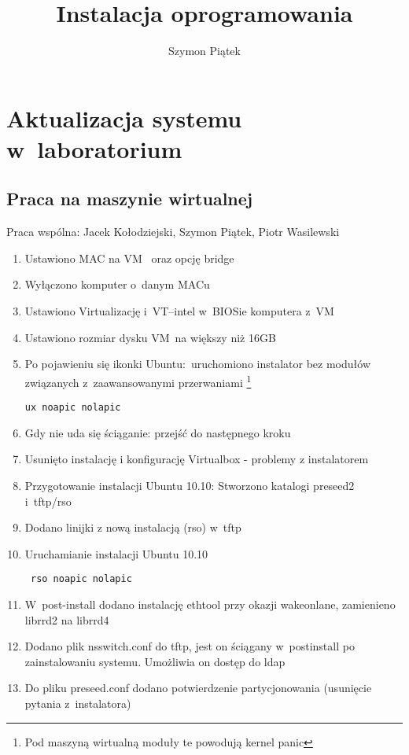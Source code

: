 


\title{Instalacja oprogramowania}
\author{Szymon Piątek}



\maketitle

\section{Aktualizacja systemu w~laboratorium}
\subsection{Praca na maszynie wirtualnej}
Praca wspólna: Jacek Kołodziejski, Szymon Piątek, Piotr Wasilewski

\begin{enumerate}
        
        \item Ustawiono MAC na VM~ oraz opcję bridge
        \item Wyłączono komputer o~danym MACu
        \item Ustawiono Virtualizację i~VT--intel w~BIOSie komputera z~VM
        \item Ustawiono rozmiar dysku VM~na większy niż 16GB
        \item Po pojawieniu się ikonki Ubuntu:~uruchomiono instalator bez modułów związanych z~zaawansowanymi przerwaniami
        \footnote{Pod maszyną wirtualną moduły te powodują kernel panic}
        \begin{verbatim}ux noapic nolapic\end{verbatim}
        \item Gdy nie uda się ściąganie: przejść do następnego kroku
        \item Usunięto instalację i konfigurację Virtualbox - problemy z instalatorem
        \item Przygotowanie instalacji Ubuntu 10.10: Stworzono katalogi preseed2 i~tftp/rso
        \item Dodano linijki z nową instalacją (rso) w~tftp
        \item Uruchamianie instalacji Ubuntu 10.10
        \begin{verbatim} rso noapic nolapic \end{verbatim}
        \item W~post-install dodano instalację ethtool przy okazji wakeonlane, zamienieno librrd2 na librrd4
        \item Dodano plik nsswitch.conf do tftp, jest on ściągany w~post\-install po zainstalowaniu systemu. Umożliwia on dostęp do ldap
        \item Do pliku preseed.conf dodano potwierdzenie partycjonowania (usunięcie pytania z~instalatora)

\end{enumerate}





                       
